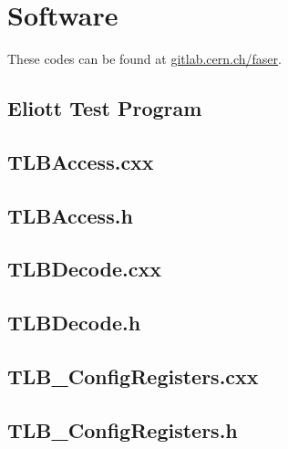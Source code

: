 \chapter{Software} 

These codes can be found at
\href{https://gitlab.cern.ch/faser/gpiodrivers/-/blob/EliottFaserDAQ/TLBAccess/src/TLBAccess.cxx}
{gitlab.cern.ch/faser}.


\section{Eliott Test Program}


\section{TLBAccess.cxx}


\section{TLBAccess.h}


\section{TLBDecode.cxx}


\section{TLBDecode.h}


\section{TLB\_ConfigRegisters.cxx}


\section{TLB\_ConfigRegisters.h}


